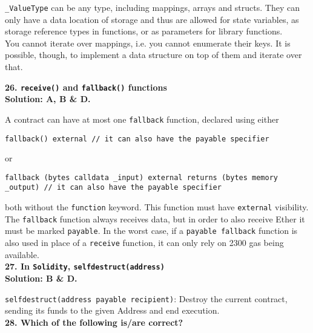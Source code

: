\verb|_ValueType| can be any type, including mappings, arrays and structs.
They can only have a data location of storage and thus are allowed for state variables, as storage reference types in functions, or as parameters for library functions.\\

You cannot iterate over mappings, i.e. you cannot enumerate their keys.
It is possible, though, to implement a data structure on top of them and iterate over that.\\

\pagebreak

\textbf{26. \texttt{receive()} and \texttt{fallback()} functions}\label{sec:exam2_q26}\\

\textbf{Solution: A, B \& D.}

A contract can have at most one \verb|fallback| function, declared using either

\begin{lstlisting}[language=Solidity, style=solStyle]
fallback() external // it can also have the payable specifier
\end{lstlisting}

or

\begin{lstlisting}[language=Solidity, style=solStyle]
fallback (bytes calldata _input) external returns (bytes memory _output) // it can also have the payable specifier
\end{lstlisting}

both without the \verb|function| keyword.
This function must have \verb|external| visibility.
The \verb|fallback| function always receives data, but in order to also receive Ether it must be marked \verb|payable|.
In the worst case, if a \verb|payable fallback| function is also used in place of a \verb|receive| function, it can only rely on 2300 gas being available.\\


\textbf{27. In \texttt{Solidity}, \texttt{selfdestruct(address)}}\label{sec:exam2_q27}\\

\textbf{Solution: B \& D.}

\verb|selfdestruct(address payable recipient)|: Destroy the current contract, sending its funds to the given Address and end execution.\\

\textbf{28. Which of the following is/are correct?}\label{sec:exam2_q28}\\

